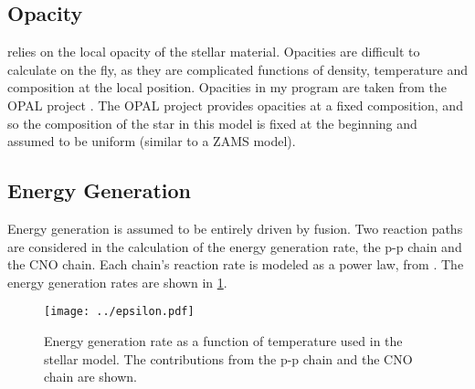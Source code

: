 \documentclass[12pt]{article}
\begin{document}
\subsection{Opacity} \label{sec:opacity}
 relies on the local opacity of the stellar material. Opacities are difficult to calculate on the fly, as they are complicated functions of density, temperature and composition at the local position. Opacities in my program are taken from the OPAL project \citep{1996ApJ...456..902R}. The OPAL project provides opacities at a fixed composition, and so the composition of the star in this model is fixed at the beginning and assumed to be uniform (similar to a ZAMS model).

\subsection{Energy Generation} \label{sec:fusion}
Energy generation is assumed to be entirely driven by fusion. Two reaction paths are considered in the calculation of the energy generation rate, the p-p chain and the CNO chain. Each chain's reaction rate is modeled as a power law, from \citet{Kippenhahn:1994tm}. The energy generation rates are shown in \cref{fig:energy}.

\begin{figure}[htbp]
   \centering
   \texttt{[image: ../epsilon.pdf]}
   \caption[Energy Generation Rate]{Energy generation rate as a function of temperature used in the stellar model. The contributions from the p-p chain and the CNO chain are shown.}
   \label{fig:energy}
\end{figure}

\end{document}
